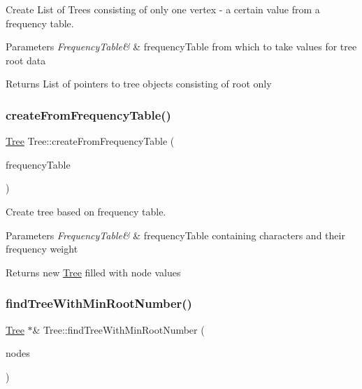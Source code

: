 Create List of Trees consisting of only one vertex -\/ a certain value from a frequency table. 


\begin{DoxyParams}{Parameters}
{\em Frequency\+Table\&} & frequency\+Table from which to take values for tree root data \\
\hline
\end{DoxyParams}
\begin{DoxyReturn}{Returns}
List of pointers to tree objects consisting of root only 
\end{DoxyReturn}
\mbox{\label{class_tree_a57608dabdd310f0c412c5d2a03faa9c0}} 
\subsubsection{\texorpdfstring{createFromFrequencyTable()}{createFromFrequencyTable()}}
{\footnotesize\ttfamily \mbox{\hyperlink{class_tree}{Tree}} Tree\+::create\+From\+Frequency\+Table (\begin{DoxyParamCaption}\item[{\mbox{\hyperlink{class_frequency_table}{Frequency\+Table}} \&}]{frequency\+Table }\end{DoxyParamCaption})}



Create tree based on frequency table. 


\begin{DoxyParams}{Parameters}
{\em Frequency\+Table\&} & frequency\+Table containing characters and their frequency weight \\
\hline
\end{DoxyParams}
\begin{DoxyReturn}{Returns}
new \mbox{\hyperlink{class_tree}{Tree}} filled with node values 
\end{DoxyReturn}
\mbox{\label{class_tree_a7bac2fabb211e80df087763da187d3f6}} 
\subsubsection{\texorpdfstring{findTreeWithMinRootNumber()}{findTreeWithMinRootNumber()}}
{\footnotesize\ttfamily \mbox{\hyperlink{class_tree}{Tree}} $\ast$\& Tree\+::find\+Tree\+With\+Min\+Root\+Number (\begin{DoxyParamCaption}\item[{list$<$ \mbox{\hyperlink{class_tree}{Tree}} $\ast$ $>$ \&}]{nodes }\end{DoxyParamCaption})}




